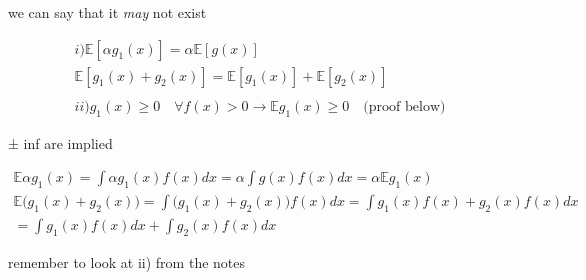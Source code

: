 \documentclass[10pt]{article}
\begin{document}
we can say that it \textit{may} not exist 

\begin{align*}
    i) \mathbb{E}[\alpha g_1(x)] = \alpha\mathbb{E}[g(x)]\\
    \mathbb{E}[g_1(x) + g_2(x)] = \mathbb{E}[g_1(x)] + \mathbb{E}[g_2(x)]\\
    \\
    ii) g_1(x) \geq 0 \quad\forall f(x) > 0 \to \mathbb{E}g_1(x) \geq 0 \quad\text{(proof below)}
\end{align*}

± inf are implied

\begin{align*}
    \mathbb{E}\alpha g_1(x) = \int \alpha g_1(x)f(x) dx = \alpha \int g(x) f(x) dx = \alpha \mathbb{E}g_1(x)\\
    \mathbb{E} \big(g_1(x) + g_2(x)\big) = \int \big(g_1(x) + g_2(x)\big)f(x)dx = \int g_1(x)f(x) + g_2(x)f(x) dx\\
    = \int g_1(x)f(x)dx + \int g_2(x)f(x)dx
\end{align*}

remember to look at ii) from the notes
\end{document}
